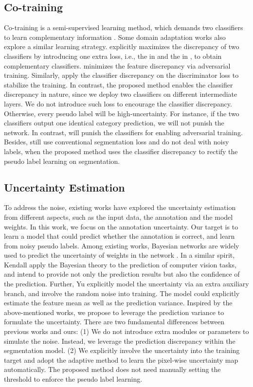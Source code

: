 \subsection{Co-training}
Co-training is a semi-supervised learning method, which demands two classifiers to learn complementary information \cite{blum1998combining}. Some domain adaptation works also explore a similar learning strategy. \cite{saito2018maximum,luo2019taking} explicitly maximizes the discrepancy of two classifiers by introducing one extra loss, i.e., the  in \cite{saito2018maximum} and the  in \cite{luo2019taking}, to obtain complementary classifiers. \cite{saito2018maximum} minimizes the feature discrepancy via adversarial training. Similarly, \cite{luo2019taking} apply the classifier discrepancy on the discriminator loss to stabilize the training.
In contrast, the proposed method enables the classifier discrepancy in nature, since we deploy two classifiers on different intermediate layers. We do not introduce such loss to encourage the classifier discrepancy. Otherwise, every pseudo label will be high-uncertainty. For instance, if the two classifiers output one identical category prediction, we will not punish the network. In contrast, \cite{saito2018maximum} will punish the classifiers for enabling adversarial training. Besides, \cite{saito2018maximum,luo2019taking} still use conventional segmentation loss and do not deal with noisy labels, when the proposed method uses the classifier discrepancy to rectify the pseudo label learning on segmentation.

\subsection{Uncertainty Estimation}
To address the noise, existing works have explored the uncertainty estimation from different aspects, such as the input data, the annotation and the model weights. In this work, we focus on the annotation uncertainty. Our target is to learn a model that could predict whether the annotation is correct, and learn from noisy pseudo labels. Among existing works, Bayesian networks are widely used to predict the uncertainty of weights in the network \cite{nielsen2009bayesian}. 
In a similar spirit, Kendall \etal \cite{kendall2017uncertainties} apply the Bayesian theory to the prediction of computer vision tasks, and intend to provide not only the prediction results but also the confidence of the prediction. 
Further, Yu \etal \cite{yu2019robust} explicitly model the uncertainty via an extra auxiliary branch, and involve the random noise into training. The model could explicitly estimate the feature mean as well as the prediction variance. 
Inspired by the above-mentioned works, we propose to leverage the prediction variance to formulate the uncertainty. There are two fundamental differences between previous works and ours: (1) We do not introduce extra modules or parameters to simulate the noise. Instead, we leverage the prediction discrepancy within the segmentation model. 
(2) We explicitly involve the uncertainty into the training target and adopt the adaptive method to learn the pixel-wise uncertainty map automatically. The proposed method does not need manually setting the threshold to enforce the pseudo label learning.

